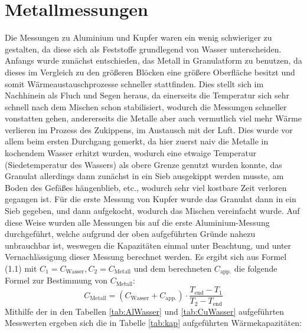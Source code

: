 \documentclass{include/protokollclass}
\begin{document}
\section{Metallmessungen}
Die Messungen zu Aluminium und Kupfer waren ein wenig schwieriger zu gestalten, da diese sich als Feststoffe grundlegend von Wasser unterscheiden. Anfangs wurde zunächst entschieden, das Metall in Granulatform zu benutzen, da dieses im Vergleich zu den größeren Blöcken eine größere Oberfläche besitzt und somit Wärmeaustauschprozesse schneller stattfinden. Dies stellt sich im Nachhinein als Fluch und Segen heraus, da einerseits die Temperatur sich sehr schnell nach dem Mischen schon stabilisiert, wodurch die Messungen schneller vonstatten gehen, andererseits die Metalle aber auch vermutlich viel mehr Wärme verlieren im Prozess des Zukippens, im Austausch mit der Luft. Dies wurde vor allem beim ersten Durchgang gemerkt, da hier zuerst naiv die Metalle in kochendem Wasser erhitzt wurden, wodurch eine etwaige Temperatur (Siedetemperatur des Wassers) als obere Grenze genutzt wurden konnte, das Granulat allerdings dann zunächst in ein Sieb ausgekippt werden musste, am Boden des Gefäßes hängenblieb, etc., wodurch sehr viel kostbare Zeit verloren gegangen ist. Für die erste Messung von Kupfer wurde das Granulat dann in ein Sieb gegeben, und dann aufgekocht, wodurch das Mischen vereinfacht wurde. Auf diese Weise wurden alle Messungen bis auf die erste Aluminium-Messung durchgeführt, welche aufgrund der oben aufgeführten Gründe nahezu unbrauchbar ist, weswegen die Kapazitäten einmal unter Beachtung, und unter Vernachlässigung dieser Messung berechnet werden. Es ergibt sich aus Formel (1.1) mit $C_1 = C_\text{Wasser}, C_2 = C_\text{Metall}$ und dem berechneten $C_\text{app.}$ die folgende Formel zur Bestimmung von $C_\text{Metall}$:
\begin{equation}
    C_\text{Metall} = (C_\text{Wasser} + C_\text{app.}) \cdot \frac{T_\text{end} - T_1}{T_2 - T_\text{end}}
\end{equation}
Mithilfe der in den Tabellen \ref{tab:AlWasser} und \ref{tab:CuWasser} aufgeführten Messwerten ergeben sich die in Tabelle \ref{tab:kap} aufgeführten Wärmekapazitäten:
\end{document}
